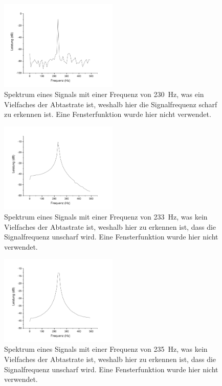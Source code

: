 \documentclass[
a4paper,
12pt,
pagesize,
ngerman
]{scrartcl}
\begin{document}
	\begin{figure}[H]  
		\includegraphics[width=0.5\textwidth]{Origin-Files/unpassend_230nonhann}
		\centering
		\caption{
			Spektrum eines Signals mit einer Frequenz von \SI{230}{\hertz}, was ein Vielfaches der Abtastrate ist, weshalb hier die Signalfrequenz scharf zu erkennen ist. Eine Fensterfunktion wurde hier nicht verwendet.
		}
		\label{fig_tag3_unpassend_230hz}
		\centering
	\end{figure}
	
	\begin{figure}[H]  
		\includegraphics[width=0.5\textwidth]{Origin-Files/unpassend_233nonhann}
		\centering
		\caption{
			Spektrum eines Signals mit einer Frequenz von \SI{233}{\hertz}, was kein Vielfaches der Abtastrate ist, weshalb hier zu erkennen ist, dass die Signalfrequenz unscharf wird. Eine Fensterfunktion wurde hier nicht verwendet.
		}
		\label{fig_tag3_unpassend_233hz}
		\centering
	\end{figure}
	
	\begin{figure}[H]  
		\includegraphics[width=0.5\textwidth]{Origin-Files/unpassend_235nonhann}
		\centering
		\caption{
			Spektrum eines Signals mit einer Frequenz von \SI{235}{\hertz}, was kein Vielfaches der Abtastrate ist, weshalb hier zu erkennen ist, dass die Signalfrequenz unscharf wird. Eine Fensterfunktion wurde hier nicht verwendet.
		}
		\label{fig_tag3_unpassend_235hz}
		\centering
	\end{figure}
\end{document}
